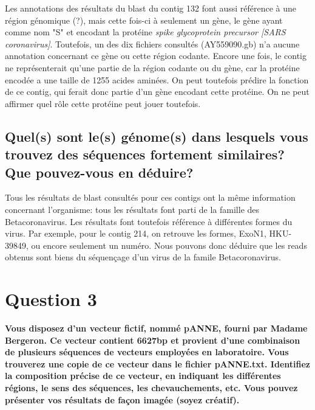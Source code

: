 \documentclass[10.8pt]{article} %
\begin{document}
Les annotations des résultats du blast du contig 132 font aussi référence à une région génomique (?), mais cette fois-ci
à seulement un gène, le gène ayant comme nom "S" et encodant la protéine \emph{spike glycoprotein precursor [SARS coronavirus]}.
Toutefois, un des dix fichiers consultés (AY559090.gb) n'a aucune annotation concernant ce gène ou cette région codante.
Encore une fois, le contig ne représenterait qu'une partie de la région codante ou du gène, car la protéine encodée a une
taille de 1255 acides aminées. On peut toutefois prédire la fonction de ce contig, qui ferait donc partie d'un gène encodant
cette protéine. On ne peut affirmer quel rôle cette protéine peut jouer toutefois.

\subsection[Génome des séquences fortement similaires]{Quel(s) sont le(s) génome(s) dans lesquels vous trouvez des séquences
fortement similaires? Que pouvez-vous en déduire?}

Tous les résultats de blast consultés pour ces contigs ont la même information concernant l'organisme: tous les résultats
font parti de la famille des Betacoronavirus. Les résultats font toutefois référence à différentes formes du virus. Par exemple,
pour le contig 214, on retrouve les formes, ExoN1, HKU-39849, ou encore seulement un numéro. Nous pouvons donc déduire que
les reads obtenus sont biens du séquençage d'un virus de la famile Betacoronavirus.

 
\section{Question 3} %

{\bf Vous disposez d'un vecteur fictif, nommé pANNE, fourni par Madame Bergeron. Ce vecteur contient 6627bp et provient
d'une combinaison de plusieurs séquences de vecteurs employées en laboratoire. Vous trouverez une copie de ce vecteur
dans le fichier pANNE.txt. Identifiez la composition précise de ce vecteur, en indiquant les différentes régions, le
sens des séquences, les chevauchements, etc. Vous pouvez présenter vos résultats de façon imagée (soyez créatif).}
\end{document}
